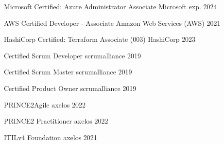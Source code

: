 

\begin{cvhonors}

  \cvhonor
    {Microsoft Certified: Azure Administrator Associate} %
    {Microsoft} %
    {} %
    {exp. 2024} %


  \cvhonor
    {AWS Certified Developer - Associate} %
    {Amazon Web Services (AWS)} %
    {} %
    {2021} %

  \cvhonor
    {HashiCorp Certified: Terraform Associate (003)} %
    {HashiCorp} %
    {} %
    {2023} %


\cvhonor
{Certified Scrum Developer} %
{scrumalliance} %
{} %
{2019} %


\cvhonor
{Certified Scrum Master} %
{scrumalliance} %
{} %
{2019} %

\cvhonor
{Certified Product Owner} %
{scrumalliance} %
{} %
{2019} %


\cvhonor
{PRINCE2Agile} %
{axelos} %
{} %
{2022} %


\cvhonor
{PRINCE2 Practitioner} %
{axelos} %
{} %
{2022} %



\cvhonor
{ITILv4 Foundation} %
{axelos} %
{} %
{2021} %


\end{cvhonors}
